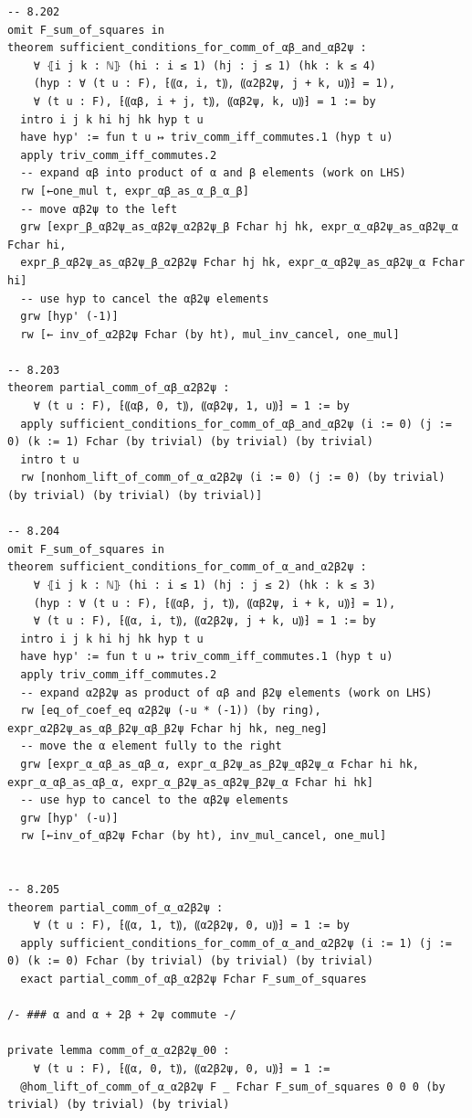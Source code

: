 \documentclass[10pt,a4paper]{article}
\begin{document}
\begin{Verbatim}
-- 8.202
omit F_sum_of_squares in
theorem sufficient_conditions_for_comm_of_αβ_and_αβ2ψ :
    ∀ ⦃i j k : ℕ⦄ (hi : i ≤ 1) (hj : j ≤ 1) (hk : k ≤ 4)
    (hyp : ∀ (t u : F), ⁅⸨α, i, t⸩, ⸨α2β2ψ, j + k, u⸩⁆ = 1),
    ∀ (t u : F), ⁅⸨αβ, i + j, t⸩, ⸨αβ2ψ, k, u⸩⁆ = 1 := by
  intro i j k hi hj hk hyp t u
  have hyp' := fun t u ↦ triv_comm_iff_commutes.1 (hyp t u)
  apply triv_comm_iff_commutes.2
  -- expand αβ into product of α and β elements (work on LHS)
  rw [←one_mul t, expr_αβ_as_α_β_α_β]
  -- move αβ2ψ to the left
  grw [expr_β_αβ2ψ_as_αβ2ψ_α2β2ψ_β Fchar hj hk, expr_α_αβ2ψ_as_αβ2ψ_α Fchar hi,
  expr_β_αβ2ψ_as_αβ2ψ_β_α2β2ψ Fchar hj hk, expr_α_αβ2ψ_as_αβ2ψ_α Fchar hi]
  -- use hyp to cancel the αβ2ψ elements
  grw [hyp' (-1)]
  rw [← inv_of_α2β2ψ Fchar (by ht), mul_inv_cancel, one_mul]

-- 8.203
theorem partial_comm_of_αβ_α2β2ψ :
    ∀ (t u : F), ⁅⸨αβ, 0, t⸩, ⸨αβ2ψ, 1, u⸩⁆ = 1 := by
  apply sufficient_conditions_for_comm_of_αβ_and_αβ2ψ (i := 0) (j := 0) (k := 1) Fchar (by trivial) (by trivial) (by trivial)
  intro t u
  rw [nonhom_lift_of_comm_of_α_α2β2ψ (i := 0) (j := 0) (by trivial) (by trivial) (by trivial) (by trivial)]

-- 8.204
omit F_sum_of_squares in
theorem sufficient_conditions_for_comm_of_α_and_α2β2ψ :
    ∀ ⦃i j k : ℕ⦄ (hi : i ≤ 1) (hj : j ≤ 2) (hk : k ≤ 3)
    (hyp : ∀ (t u : F), ⁅⸨αβ, j, t⸩, ⸨αβ2ψ, i + k, u⸩⁆ = 1),
    ∀ (t u : F), ⁅⸨α, i, t⸩, ⸨α2β2ψ, j + k, u⸩⁆ = 1 := by
  intro i j k hi hj hk hyp t u
  have hyp' := fun t u ↦ triv_comm_iff_commutes.1 (hyp t u)
  apply triv_comm_iff_commutes.2
  -- expand α2β2ψ as product of αβ and β2ψ elements (work on LHS)
  rw [eq_of_coef_eq α2β2ψ (-u * (-1)) (by ring), expr_α2β2ψ_as_αβ_β2ψ_αβ_β2ψ Fchar hj hk, neg_neg]
  -- move the α element fully to the right
  grw [expr_α_αβ_as_αβ_α, expr_α_β2ψ_as_β2ψ_αβ2ψ_α Fchar hi hk, expr_α_αβ_as_αβ_α, expr_α_β2ψ_as_αβ2ψ_β2ψ_α Fchar hi hk]
  -- use hyp to cancel to the αβ2ψ elements
  grw [hyp' (-u)]
  rw [←inv_of_αβ2ψ Fchar (by ht), inv_mul_cancel, one_mul]


-- 8.205
theorem partial_comm_of_α_α2β2ψ :
    ∀ (t u : F), ⁅⸨α, 1, t⸩, ⸨α2β2ψ, 0, u⸩⁆ = 1 := by
  apply sufficient_conditions_for_comm_of_α_and_α2β2ψ (i := 1) (j := 0) (k := 0) Fchar (by trivial) (by trivial) (by trivial)
  exact partial_comm_of_αβ_α2β2ψ Fchar F_sum_of_squares

/- ### α and α + 2β + 2ψ commute -/

private lemma comm_of_α_α2β2ψ_00 :
    ∀ (t u : F), ⁅⸨α, 0, t⸩, ⸨α2β2ψ, 0, u⸩⁆ = 1 :=
  @hom_lift_of_comm_of_α_α2β2ψ F _ Fchar F_sum_of_squares 0 0 0 (by trivial) (by trivial) (by trivial)


\end{Verbatim}
\end{document}
